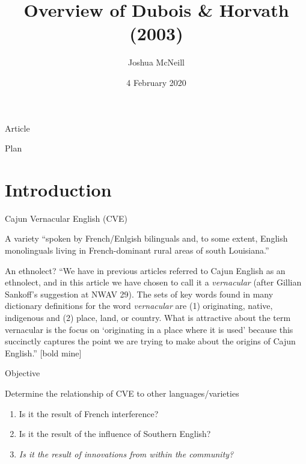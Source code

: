\documentclass{beamer}
\author{Joshua McNeill}
\date{4 February 2020}
\title{Overview of Dubois \& Horvath (2003)}
\begin{document}
  \begin{frame}
    \titlepage
  \end{frame}

  \begin{frame}{Article}
  \end{frame}

  \begin{frame}{Plan}
    \tableofcontents
  \end{frame}


  \section{Introduction}
    \begin{frame}{Cajun Vernacular English (CVE)}
      \begin{definition}
        A variety ``spoken by French/Enlgish bilinguals and, to some extent, English monolinguals living in French-dominant rural areas of south Louisiana.''
      \end{definition}
      \begin{block}{An ethnolect?}
        ``We have in previous articles referred to \alert{Cajun} English as an \alert{ethnolect}, and in this article we have chosen to call it a \emph{vernacular} (after Gillian Sankoff’s suggestion at NWAV 29).
        The sets of key words found in many dictionary definitions for the word \emph{vernacular} are (1) originating, native, indigenous and (2) place, land, or country.
        What is attractive about the term vernacular is the focus on `originating in a place where it is used' because this succinctly captures the point we are trying to make about the origins of Cajun English.'' [bold mine]
      \end{block}
    \end{frame}

    \begin{frame}{Objective}
      \begin{block}{Determine the relationship of CVE to other languages/varieties}
        \begin{enumerate}
          \item Is it the result of French interference?
          \item Is it the result of the influence of Southern English?
          \item \emph{Is it the result of innovations from within the community?}
        \end{enumerate}
      \end{block}
    \end{frame}
\end{document}
